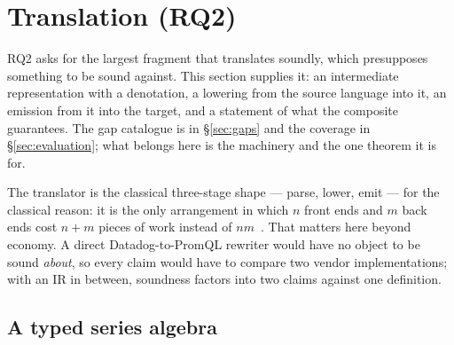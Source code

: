 \section{Translation (RQ2)}
\label{sec:translation}
RQ2 asks for the largest fragment that translates soundly, which presupposes something
to be sound against. This section supplies it: an intermediate representation with a
denotation, a lowering from the source language into it, an emission from it into the
target, and a statement of what the composite guarantees. The gap catalogue is in
\S\ref{sec:gaps} and the coverage in \S\ref{sec:evaluation}; what belongs here is the
machinery and the one theorem it is for.

The translator is the classical three-stage shape --- parse, lower, emit --- for the
classical reason: it is the only arrangement in which $n$ front ends and $m$ back ends
cost $n+m$ pieces of work instead of $nm$~\citep{aho2006}. That matters here beyond
economy. A direct Datadog-to-PromQL rewriter would have no object to be sound
\emph{about}, so every claim would have to compare two vendor implementations; with an
IR in between, soundness factors into two claims against one definition.

\subsection{A typed series algebra}
\label{sec:ir}

